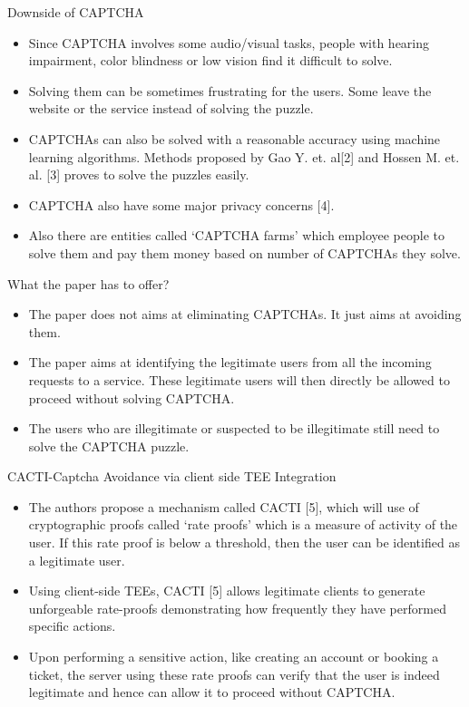 \documentclass{beamer}
\begin{document}
\begin{frame}{Downside of CAPTCHA}

	\begin{itemize}
		\item Since CAPTCHA involves some audio/visual tasks, people with hearing impairment, color blindness or low vision find it difficult to solve.
		\item Solving them can be sometimes frustrating for the users. Some leave the website or the service instead of solving the puzzle.
		\item CAPTCHAs can also be solved with a reasonable accuracy using machine learning algorithms. Methods proposed by Gao Y. et. al[2] and Hossen M. et. al. [3] proves to solve the puzzles easily.
		\item CAPTCHA also have some major privacy concerns [4].
		\item Also there are entities called ‘CAPTCHA farms’ which employee people to solve them and pay them money based on number of CAPTCHAs they solve.
	\end{itemize}

\end{frame}

\begin{frame}{What the paper has to offer?}
	\begin{itemize}
		\item The paper does not aims at eliminating CAPTCHAs. It just aims at avoiding them.

		\item The paper aims at identifying the legitimate users from all the incoming requests to a service. These legitimate users will then directly be allowed to proceed without solving CAPTCHA.

		\item The users who are illegitimate or suspected to be illegitimate still need to solve the CAPTCHA puzzle.
	\end{itemize}
\end{frame}

\begin{frame}{CACTI-Captcha Avoidance via client side TEE Integration}
	\begin{itemize}
		\item The authors propose a mechanism called CACTI [5], which will use of cryptographic proofs called ‘rate proofs’ which is a measure of activity of the user. If this rate proof is below a threshold, then the user can be identified as a legitimate user.
		\item Using client-side TEEs, CACTI [5] allows legitimate clients to generate unforgeable rate-proofs demonstrating how frequently they have performed specific actions.
		\item Upon performing a sensitive action, like creating an account or booking a ticket, the server using these rate proofs can verify that the user is indeed legitimate and hence can allow it to proceed without CAPTCHA.
	\end{itemize}
\end{frame}
\end{document}
